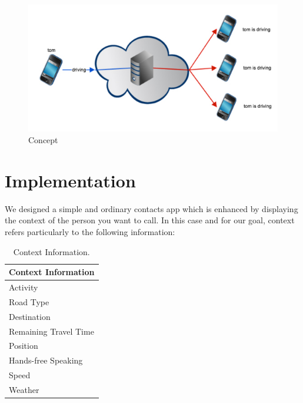 \documentclass{sigchi}
\begin{document}
\begin{figure}[H]
	\centering
		\includegraphics[width=.95\linewidth]{figures/concept}
		\caption{Concept}
	\label{fig:app_concept}
\end{figure}

\section{Implementation}

We designed a simple and ordinary contacts app which is enhanced by displaying the context of the person you want to call. In this case and for our goal, context refers particularly to the following information:
\newline

\begin{center}
\begin{table}[htbp]
\begin{center}
\begin{tabular}[center]{l}
\toprule
Context Information\\
\midrule
Activity \\
Road Type \\
Destination \\
Remaining Travel Time \\
Position \\
Hands-free Speaking \\
Speed \\
Weather \\
\bottomrule
\end{tabular}
\end{center}
\caption[Context Information]{Context Information.\label{tab:cont}}
\end{table}
\end{center}
\end{document}
